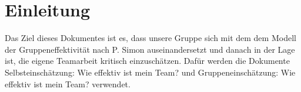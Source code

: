 
\chapter{Einleitung}

Das Ziel dieses Dokumentes ist es, dass unsere Gruppe sich mit dem dem Modell der Gruppeneffektivität nach P. Simon \cite{simon2002entwicklung} \citep{stumpf2003teamarbeit} auseinandersetzt und danach in der Lage ist, die eigene Teamarbeit kritisch einzuschätzen. Dafür werden die Dokumente Selbsteinschätzung: Wie effektiv ist mein Team? und Gruppeneinschätzung: Wie effektiv ist mein Team? verwendet. 
